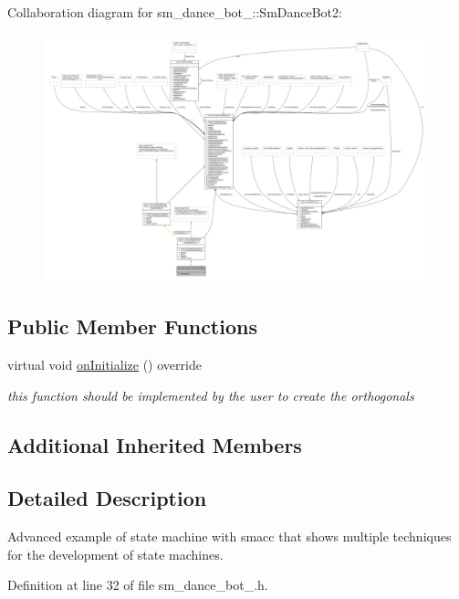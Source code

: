 Collaboration diagram for sm\+\_\+dance\+\_\+bot\+\_\+:\+:Sm\+Dance\+Bot2\+:
\nopagebreak
\begin{figure}[H]
\begin{center}
\leavevmode
\includegraphics[width=350pt]{structsm__dance__bot__2_1_1SmDanceBot2__coll__graph}
\end{center}
\end{figure}
\subsection*{Public Member Functions}
\begin{DoxyCompactItemize}
\item 
virtual void \hyperlink{structsm__dance__bot__2_1_1SmDanceBot2_a15cabce5763a486bf6ace2ed5850480c}{on\+Initialize} () override
\begin{DoxyCompactList}\small\item\em this function should be implemented by the user to create the orthogonals \end{DoxyCompactList}\end{DoxyCompactItemize}
\subsection*{Additional Inherited Members}


\subsection{Detailed Description}
Advanced example of state machine with smacc that shows multiple techniques for the development of state machines. 

Definition at line 32 of file sm\+\_\+dance\+\_\+bot\+\_.\+h.



